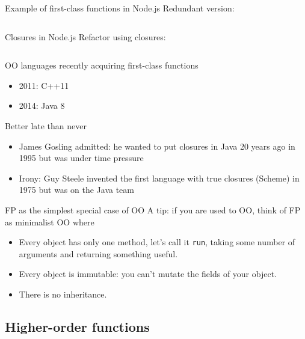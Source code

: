 \begin{frame}[fragile]{Example of first-class functions in Node.js}
  Redundant version:
  \inputminted{js}{greeters.js}
\end{frame}

\begin{frame}[fragile]{Closures in Node.js}
  Refactor using closures:
  \inputminted{js}{closureGreeters.js}
\end{frame}

\begin{frame}{OO languages recently acquiring first-class functions}
   \begin{itemize}
   \item 2011: C++11
   \item 2014: Java 8
   \end{itemize}

   \begin{block}{Better late than never}
     \begin{itemize}
     \item James Gosling admitted: he wanted to put closures in Java
       20 years ago in 1995 but was under time pressure
     \item Irony: Guy Steele invented the first language with true
       closures (Scheme) in 1975 but was on the Java team
     \end{itemize}
   \end{block}
\end{frame}

\begin{frame}{FP as the simplest special case of OO}
  A tip: if you are used to OO, think of FP as minimalist OO where
  \begin{itemize}
  \item Every object has only one method, let's call it
    \texttt{run}, taking some number of arguments and
    returning something useful.
  \item Every object is immutable: you can't mutate the fields of your
    object.
  \item There is no inheritance.
  \end{itemize}
\end{frame}

\subsection{Higher-order functions}


